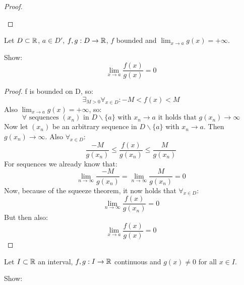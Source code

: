 \documentclass[week=6]{homework}
\begin{document}
\begin{questions}
\begin{proof}
\begin{itemize}
	        	
	        \end{itemize}
        \end{proof}
        
        \question
        Let $D \subset \mathbb{R} $, $a \in D'$, $f, g : D \to \mathbb{R}$, $f$ bounded and $\lim_{x \to a} g(x) = +\infty$. 
        
        Show:
        \[
	        \lim_{x \to a} \frac{f(x)}{g(x)} = 0
        \]
        
        \begin{proof}
        	f is bounded on D, so:
        	\[
	        	\exists_{M > 0} \forall_{x \in D} : -M < f(x) < M
        	\]
        	Also $\lim_{x \to a} g(x) = +\infty$, so:
        	\[
	        	\forall \text{ sequences } (x_n) \text{ in } D\backslash \{a\} \text{ with } x_n \to a \text{ it holds that } g(x_n) \to \infty
        	\]
        	Now let $(x_n)$ be an arbitrary sequence in $D\backslash \{a\}$ with $x_n \to a$. Then $g(x_n) \to \infty $. Also $\forall_{x \in D}$:
        	\[
	        	\frac{-M}{g(x_n)} \le \frac{f(x)}{g(x_n)} \le \frac{M}{g(x_n)}
        	\]
        	For sequences we already know that:
        	\[
	        	\lim_{n \to \infty} \frac{-M}{g(x_n)} = \lim_{n \to \infty} \frac{M}{g(x_n)} = 0
        	\]
        	Now, because of the squeeze theorem, it now holds that $\forall_{x \in D}$:
        	\[
	        	\lim_{n \to \infty} \frac{f(x)}{g(x_n)} = 0
        	\]
        	But then also:
        	\[
	        	\lim_{x \to a} \frac{f(x)}{g(x)} = 0
        	\]
        \end{proof}
        
        \question
        Let $I \subset \mathbb{R}$ an interval, $f, g : I \to \mathbb{R}$ continuous and $g(x) \neq 0$ for all $x \in I$. 
        
        Show:
        
\end{questions}
\end{document}
